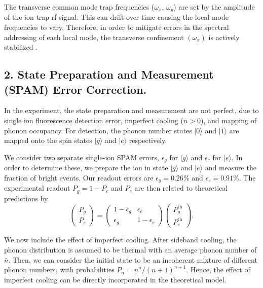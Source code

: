 \documentclass[groupaddress,9pt,twocolumn,superscriptaddress, aps, prl]{revtex4-1}
\newcommand{\ket}[1]{|#1\rangle}
\begin{document}
The transverse common mode trap frequencies ($\omega_x$, $\omega_y$) are set by the amplitude of the ion trap rf signal. This can drift over time causing the local mode frequencies to vary. Therefore, in order to mitigate errors in the spectral addressing of each local mode, the transverse confinement $(\omega_x)$ is actively stabilized \cite{Johnson2016}. 

\subsection{2. State Preparation and Measurement (SPAM) Error Correction. }
In the experiment, the state preparation and measurement are not perfect, due to single ion fluorescence detection error, imperfect cooling ($\bar{n} > 0$), and mapping of phonon occupancy. For detection, the phonon number states $\ket{0}$ and $\ket{1}$ are mapped onto the spin states $\ket{g}$ and $\ket{e}$ respectively. 

We consider two separate single-ion SPAM errors, $\epsilon_{g}$ for $\ket{g}$ and $\epsilon_{e}$ for $\ket{e}$. In order to determine these, we prepare the ion in state $\ket{g}$ and $\ket{e}$ and measure the fraction of bright events. Our readout errors are $\epsilon_{g} = 0.26\%$ and $\epsilon_{e} = 0.91\%$. The experimental readout $P_{g} = 1-P_{e}$ and $P_{e}$ are then related to theoretical predictions by \cite{Shen2012}
\begin{equation}
\left(\begin{array}{c}P_{g} \\P_{e}\end{array}\right) = 
\left(\begin{array}{cc}1-\epsilon_{g} & \epsilon_{e} \\ \epsilon_{g} & 1-\epsilon_{e}\end{array}\right)
\left(\begin{array}{c} P_{g}^{\text{th}}  \\ P_{e}^{\text{th}}  \end{array}\right). 
\end{equation}

We now include the effect of imperfect cooling. After sideband cooling, the phonon distribution is assumed to be thermal with an average phonon number of $\bar{n}$. Then, we can consider the initial state to be an incoherent mixture of different phonon numbers, with probabilities $P_{n} = \bar{n}^{n}/(\bar{n}+1)^{n+1}$. Hence, the effect of imperfect cooling can be directly incorporated in the theoretical model.
\end{document}
